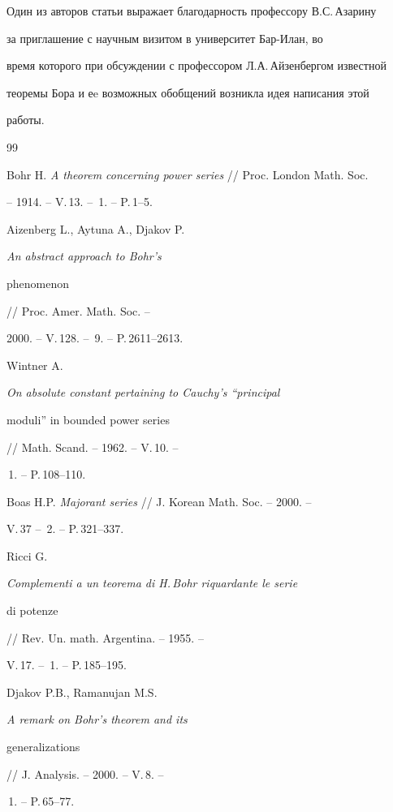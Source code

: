 Один из авторов статьи выражает благодарность профессору В.С.\,Азарину 


за приглашение с научным визитом в университет Бар-Илан, во


время которого при обсуждении с профессором Л.А.\,Айзенбергом известной


теоремы Бора и еe возможных обобщений возникла идея написания этой


работы.





\begin{thebibliography}{99}







Bohr H. {\it A theorem concerning power series} // Proc. London Math. Soc.


-- 1914. -- V.\,13. -- \No\,1. -- P.\,1--5.




Aizenberg L., Aytuna A., Djakov P. {\it An abstract approach to Bohr's


phenomenon} // Proc. Amer. Math. Soc. --


2000. -- V.\,128. -- \No\,9. -- P.\,2611--2613.




Wintner A. {\it On absolute constant pertaining to Cauchy's ``principal


moduli'' in bounded power series} // Math. Scand. -- 1962. -- V.\,10. --


\No\,1. -- P.\,108--110.




Boas H.P. {\it Majorant series} // J. Korean Math. Soc. -- 2000. --


V.\,37 -- \No\,2. -- P.\,321--337.




Ricci G. {\it Complementi a un teorema di H.\,Bohr riquardante le serie


di potenze} // Rev. Un. math. Argentina. -- 1955. --


V.\,17. -- \No\,1. -- P.\,185--195.




Djakov P.B., Ramanujan M.S. {\it A remark on Bohr's theorem and its


generalizations} // J. Analysis. -- 2000. -- V.\,8. --


\No\,1. -- P.\,65--77.



\end{thebibliography}
